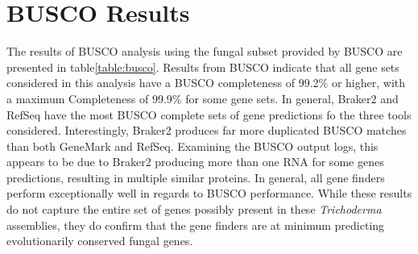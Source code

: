 \section{BUSCO Results}

The results of BUSCO analysis using the fungal subset provided by
BUSCO are presented in table\ref{table:busco}. Results from BUSCO
indicate that all gene sets considered in this analysis have a BUSCO
completeness of 99.2\% or higher, with a maximum Completeness of
99.9\% for some gene sets. In general, Braker2 and RefSeq have the
most BUSCO complete sets of gene predictions fo the three tools
considered. Interestingly, Braker2 produces far more duplicated BUSCO
matches than both GeneMark and RefSeq. Examining the BUSCO output
logs, this appears to be due to Braker2 producing more than one RNA
for some genes predictions, resulting in multiple similar proteins. In
general, all gene finders perform exceptionally well in regards to
BUSCO performance. While these results do not capture the entire set
of genes possibly present in these \textit{Trichoderma} assemblies,
they do confirm that the gene finders are at minimum predicting
evolutionarily conserved fungal genes.

